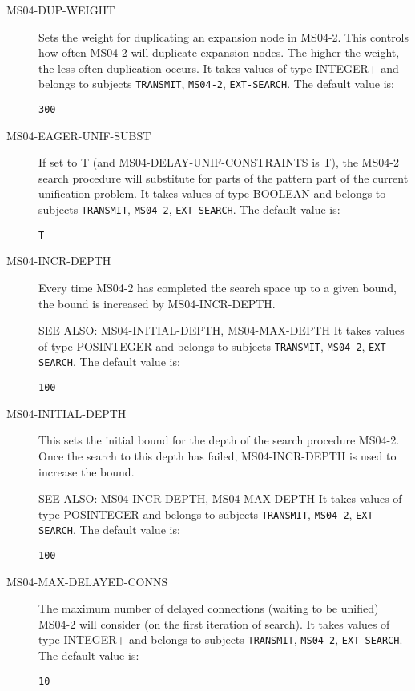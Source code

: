 \begin{description}
\item[MS04-DUP-WEIGHT]  
Sets the weight for duplicating an expansion node in MS04-2.
This controls how often MS04-2 will duplicate expansion nodes.  The higher
the weight, the less often duplication occurs.
It takes values of type INTEGER+ and belongs to subjects \texttt{TRANSMIT}, \texttt{MS04-2}, \texttt{EXT-SEARCH}.  The default value is: \begin{lstlisting}
300
\end{lstlisting}

\item[MS04-EAGER-UNIF-SUBST]  
If set to T (and MS04-DELAY-UNIF-CONSTRAINTS is T), the MS04-2 search
procedure will substitute for parts of the pattern part of the current
unification problem.
It takes values of type BOOLEAN and belongs to subjects \texttt{TRANSMIT}, \texttt{MS04-2}, \texttt{EXT-SEARCH}.  The default value is: \begin{lstlisting}
T
\end{lstlisting}

\item[MS04-INCR-DEPTH]  
Every time MS04-2 has completed the search space up to a given bound,
the bound is increased by MS04-INCR-DEPTH.

SEE ALSO: MS04-INITIAL-DEPTH, MS04-MAX-DEPTH
It takes values of type POSINTEGER and belongs to subjects \texttt{TRANSMIT}, \texttt{MS04-2}, \texttt{EXT-SEARCH}.  The default value is: \begin{lstlisting}
100
\end{lstlisting}

\item[MS04-INITIAL-DEPTH]  
This sets the initial bound for the depth of the search procedure
MS04-2.  Once the search to this depth has failed, MS04-INCR-DEPTH
is used to increase the bound.

SEE ALSO: MS04-INCR-DEPTH, MS04-MAX-DEPTH
It takes values of type POSINTEGER and belongs to subjects \texttt{TRANSMIT}, \texttt{MS04-2}, \texttt{EXT-SEARCH}.  The default value is: \begin{lstlisting}
100
\end{lstlisting}

\item[MS04-MAX-DELAYED-CONNS]  
The maximum number of delayed connections (waiting to be unified)
MS04-2 will consider (on the first iteration of search).
It takes values of type INTEGER+ and belongs to subjects \texttt{TRANSMIT}, \texttt{MS04-2}, \texttt{EXT-SEARCH}.  The default value is: \begin{lstlisting}
10
\end{lstlisting}


\end{description}
